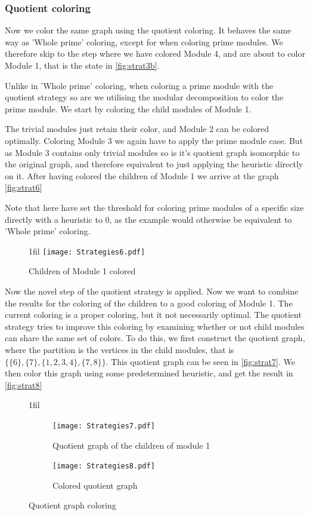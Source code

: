 \documentclass[a4paper]{article}
\makeatletter
\newcommand*{\centerfloat}{%
  \parindent \z@
  \leftskip \z@ \@plus 1fil \@minus \textwidth
  \rightskip\leftskip
  \parfillskip \z@skip}
\makeatother
\begin{document}
\subsubsection{Quotient coloring}
Now we color the same graph using the quotient coloring. It behaves the same way
as 'Whole prime' coloring, except for when coloring prime modules. We therefore
skip to the step where we have colored Module 4, and are about to color 
Module 1, that is the state in \autoref{fig:strat3b}.

Unlike in 'Whole prime' coloring, when coloring a prime module with the quotient
strategy so are we utilising the modular decomposition to color the prime
module. We start by coloring the child modules of Module 1.

The trivial modules just retain their color, and Module 2 can be colored
optimally. Coloring Module 3 we again have to apply the prime module case. But as
Module 3 contains only trivial modules so is it's quotient graph isomorphic to
the original graph, and therefore equivalent to just applying the heuristic
directly on it. After having colored the children of Module 1 we arrive at the
graph \autoref{fig:strat6}

Note that here have set the threshold for coloring prime modules of a specific size
directly with a heuristic to 0, as the example would otherwise be equivalent to
'Whole prime' coloring. 

\begin{figure}[H]
    \centerfloat
    \texttt{[image: Strategies6.pdf]}
    \caption{Children of Module 1 colored}
    \label{fig:strat6}
\end{figure}

Now the novel step of the quotient strategy is applied. Now we want to combine
the results for the coloring of the children to a good coloring of Module 1.
The current coloring is a proper coloring, but it not necessarily optimal. The
quotient strategy tries to improve this coloring by examining whether or not
child modules can share the same set of colors. To do this, we first construct
the quotient graph, where the partition is the vertices in the child modules,
that is $\{\{6\},\{7\},\{1,2,3,4\},\{7,8\}\}$. This quotient graph can be seen
in \autoref{fig:strat7}. We then color this graph using some predetermined
heuristic, and get the result in \autoref{fig:strat8}

\begin{figure}[H]
\centerfloat
    \begin{subfigure}{.4\textwidth}
        \texttt{[image: Strategies7.pdf]}
      \caption{Quotient graph of the children of module 1}
      \label{fig:strat7}
    \end{subfigure}%
    \begin{subfigure}{.4\textwidth}
        \texttt{[image: Strategies8.pdf]}
      \caption{Colored quotient graph}
      \label{fig:strat8}
    \end{subfigure}

    \caption{Quotient graph coloring}
\end{figure}
\end{document}
